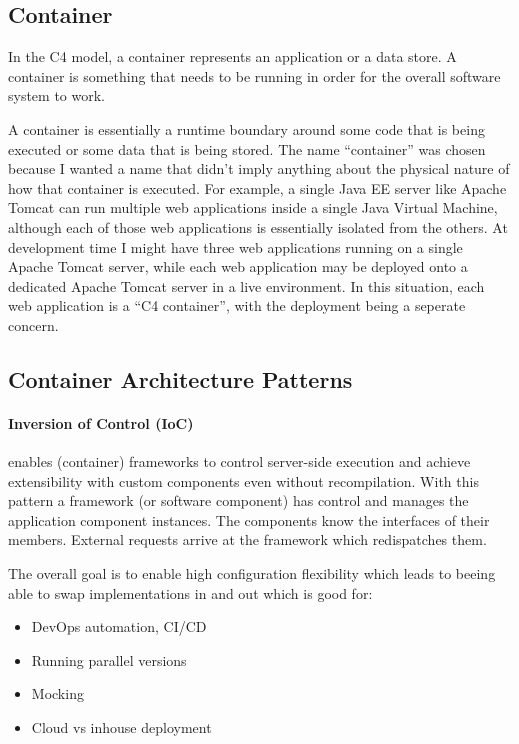 \documentclass[../Main.tex]{subfiles}
\begin{document}
\subsection{Container}

In the C4 model, a container represents an application or a data store.
A container is something that needs to be running in order for the overall software system to work.

A container is essentially a runtime boundary around some code that is
being executed or some data that is being stored. The name “container”
was chosen because I wanted a name that didn't imply anything about the
physical nature of how that container is executed. For example,
a single Java EE server like Apache Tomcat can run multiple web
applications inside a single Java Virtual Machine, although each of
those web applications is essentially isolated from the others.
At development time I might have three web applications running on
a single Apache Tomcat server, while each web application may be
deployed onto a dedicated Apache Tomcat server in a live environment.
In this situation, each web application is a “C4 container”,
with the deployment being a seperate concern.

\subsection{Container Architecture Patterns}
\paragraph{Inversion of Control (IoC)}
enables (container) frameworks to control server-side execution
and achieve extensibility with custom components even without recompilation.
With this pattern a framework (or software component) has control and
manages the application component instances.
The components know the interfaces of their members.
External requests arrive at the framework which redispatches them.

The overall goal is to enable high configuration flexibility
which leads to beeing able to swap implementations in and out which
is good for:
\begin{itemize}
    \item DevOps automation, CI/CD
    \item Running parallel versions
    \item Mocking
    \item Cloud vs inhouse deployment
\end{itemize}
\end{document}
